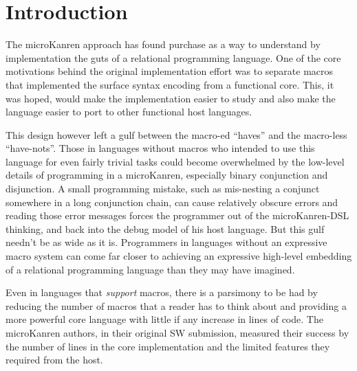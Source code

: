 \documentclass[sigplan,screen,draft,anonymous,review,natbib=false]{acmart}
\begin{document}


\maketitle

\section{Introduction}

The microKanren approach has found purchase as a way to understand by
implementation the guts of a relational programming language. One of
the core motivations behind the original implementation effort was to
separate macros that implemented the surface syntax encoding from a
functional core. This, it was hoped, would make the implementation
easier to study and also make the language easier to port to other
functional host languages.

This design however left a gulf between the macro-ed \enquote{haves}
and the macro-less \enquote{have-nots}. Those in languages without
macros who intended to use this language for even fairly trivial tasks
could become overwhelmed by the low-level details of programming in a
microKanren, especially binary conjunction and disjunction. A small
programming mistake, such as mis-nesting a conjunct somewhere in a
long conjunction chain, can cause relatively obscure errors and
reading those error messages forces the programmer out of the
microKanren-DSL thinking, and back into the debug model of his host
language. But this gulf needn't be as wide as it is. Programmers in
languages without an expressive macro system can come far closer to
achieving an expressive high-level embedding of a relational
programming language than they may have imagined.

Even in languages that \emph{support} macros, there is a parsimony to
be had by reducing the number of macros that a reader has to think
about and providing a more powerful core language with little if any
increase in lines of code. The microKanren authors, in their original
SW submission, measured their success by the number of lines in the
core implementation and the limited features they required from the
host.
\end{document}
